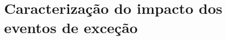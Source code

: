 \documentclass[
	12pt,				%
	oneside,			%
	a4paper,			%
	english,			%
	brazil				%
	]{abntex2ppgsi}
\begin{document}
{{%

\chapter{Caracterização do impacto dos eventos de exceção}
\label{dataCorr}

}}
\end{document}

